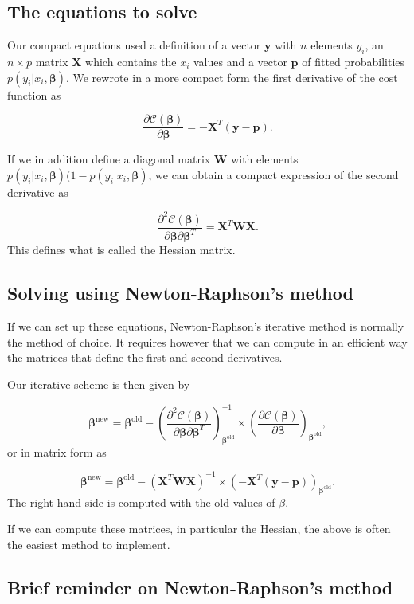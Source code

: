 \documentclass[%
oneside,                 %
final,                   %
10pt]{article}
\begin{document}
\subsection{The equations to solve}

Our compact equations used a definition of a vector $\bm{y}$ with $n$
elements $y_i$, an $n\times p$ matrix $\bm{X}$ which contains the
$x_i$ values and a vector $\bm{p}$ of fitted probabilities
$p(y_i\vert x_i,\bm{\beta})$. We rewrote in a more compact form
the first derivative of the cost function as

\[
\frac{\partial \mathcal{C}(\bm{\beta})}{\partial \bm{\beta}} = -\bm{X}^T\left(\bm{y}-\bm{p}\right). 
\]

If we in addition define a diagonal matrix $\bm{W}$ with elements 
$p(y_i\vert x_i,\bm{\beta})(1-p(y_i\vert x_i,\bm{\beta})$, we can obtain a compact expression of the second derivative as 

\[
\frac{\partial^2 \mathcal{C}(\bm{\beta})}{\partial \bm{\beta}\partial \bm{\beta}^T} = \bm{X}^T\bm{W}\bm{X}. 
\]
This defines what is called  the Hessian matrix.

\subsection{Solving using Newton-Raphson's method}

If we can set up these equations, Newton-Raphson's iterative method is normally the method of choice. It requires however that we can compute in an efficient way the  matrices that define the first and second derivatives. 

Our iterative scheme is then given by

\[
\bm{\beta}^{\mathrm{new}} = \bm{\beta}^{\mathrm{old}}-\left(\frac{\partial^2 \mathcal{C}(\bm{\beta})}{\partial \bm{\beta}\partial \bm{\beta}^T}\right)^{-1}_{\bm{\beta}^{\mathrm{old}}}\times \left(\frac{\partial \mathcal{C}(\bm{\beta})}{\partial \bm{\beta}}\right)_{\bm{\beta}^{\mathrm{old}}},
\]
or in matrix form as

\[
\bm{\beta}^{\mathrm{new}} = \bm{\beta}^{\mathrm{old}}-\left(\bm{X}^T\bm{W}\bm{X} \right)^{-1}\times \left(-\bm{X}^T(\bm{y}-\bm{p}) \right)_{\bm{\beta}^{\mathrm{old}}}.
\]
The right-hand side is computed with the old values of $\beta$. 

If we can compute these matrices, in particular the Hessian, the above is often the easiest method to implement. 


\subsection{Brief reminder on Newton-Raphson's method}
\end{document}
